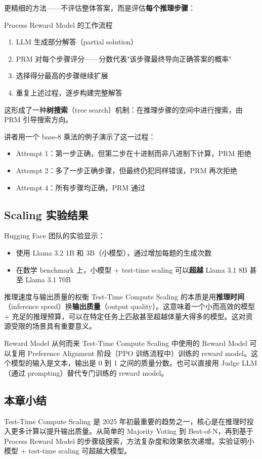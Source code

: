 更精细的方法——不评估整体答案，而是评估\textbf{每个推理步骤}：

\begin{importantbox}{Process Reward Model 的工作流程}
\begin{enumerate}
    \item LLM 生成部分解答（partial solution）
    \item PRM 对每个步骤评分——分数代表"该步骤最终导向正确答案的概率"
    \item 选择得分最高的步骤继续扩展
    \item 重复上述过程，逐步构建完整解答
\end{enumerate}
这形成了一种\textbf{树搜索}（tree search）机制：在推理步骤的空间中进行搜索，由 PRM 引导搜索方向。
\end{importantbox}

讲者用一个 base-8 乘法的例子演示了这一过程：

\begin{itemize}
    \item Attempt 1：第一步正确，但第二步在十进制而非八进制下计算，PRM 拒绝
    \item Attempt 2：多了一步正确步骤，但最终仍犯同样错误，PRM 再次拒绝
    \item Attempt 4：所有步骤均正确，PRM 通过
\end{itemize}

\subsection{Scaling 实验结果}

Hugging Face 团队的实验显示：

\begin{itemize}
    \item 使用 Llama 3.2 1B 和 3B（小模型），通过增加每题的生成次数
    \item 在数学 benchmark 上，小模型 + test-time scaling 可以\textbf{超越} Llama 3.1 8B 甚至 Llama 3.1 70B
\end{itemize}

\begin{importantbox}{推理速度与输出质量的权衡}
Test-Time Compute Scaling 的本质是用\textbf{推理时间}（inference speed）换\textbf{输出质量}（output quality）。这意味着一个小而高效的模型 + 充足的推理预算，可以在特定任务上匹敌甚至超越体量大得多的模型。这对资源受限的场景具有重要意义。
\end{importantbox}

\begin{knowledgebox}{Reward Model 从何而来}
Test-Time Compute Scaling 中使用的 Reward Model 可以复用 Preference Alignment 阶段（PPO 训练流程中）训练的 reward model。这个模型的输入是文本，输出是 0 到 1 之间的质量分数。也可以直接用 Judge LLM（通过 prompting）替代专门训练的 reward model。
\end{knowledgebox}

\subsection{本章小结}

Test-Time Compute Scaling 是 2025 年初最重要的趋势之一，核心是在推理时投入更多计算以提升输出质量。从简单的 Majority Voting 到 Best-of-N，再到基于 Process Reward Model 的步骤级搜索，方法复杂度和效果依次递增。实验证明小模型 + test-time scaling 可超越大模型。

\newpage
